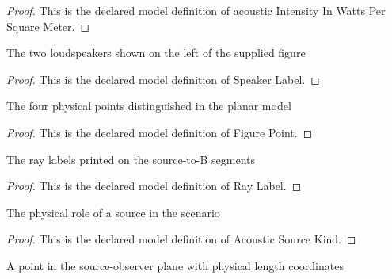 \begin{proof}
  This is the declared model definition of acoustic Intensity In Watts Per Square Meter.
\end{proof}
\begin{definition}
  \label{def:physics:phyx-mini-0246:phyxminiproblems-problemphyxmini0246-speakerlabel}
  The two loudspeakers shown on the left of the supplied figure
\end{definition}
\begin{proof}
  This is the declared model definition of Speaker Label.
\end{proof}
\begin{definition}
  \label{def:physics:phyx-mini-0246:phyxminiproblems-problemphyxmini0246-figurepoint}
  The four physical points distinguished in the planar model
\end{definition}
\begin{proof}
  This is the declared model definition of Figure Point.
\end{proof}
\begin{definition}
  \label{def:physics:phyx-mini-0246:phyxminiproblems-problemphyxmini0246-raylabel}
  The ray labels printed on the source-to-B segments
\end{definition}
\begin{proof}
  This is the declared model definition of Ray Label.
\end{proof}
\begin{definition}
  \label{def:physics:phyx-mini-0246:phyxminiproblems-problemphyxmini0246-acousticsourcekind}
  The physical role of a source in the scenario
\end{definition}
\begin{proof}
  This is the declared model definition of Acoustic Source Kind.
\end{proof}
\begin{definition}
  \label{def:physics:phyx-mini-0246:phyxminiproblems-problemphyxmini0246-planarposition}
  A point in the source-observer plane with physical length coordinates
\end{definition}
